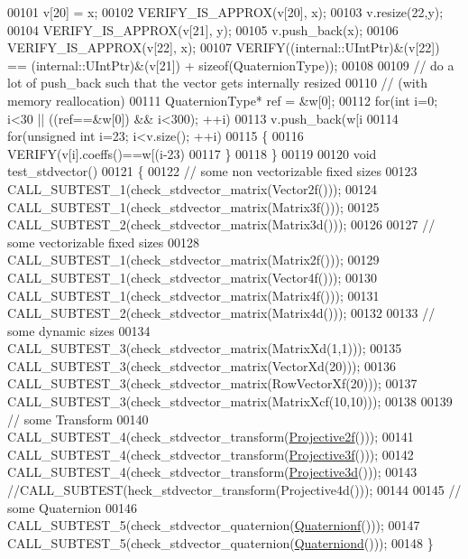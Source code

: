 \begin{DoxyCode}
00101   v[20] = x;
00102   VERIFY\_IS\_APPROX(v[20], x);
00103   v.resize(22,y);
00104   VERIFY\_IS\_APPROX(v[21], y);
00105   v.push\_back(x);
00106   VERIFY\_IS\_APPROX(v[22], x);
00107   VERIFY((internal::UIntPtr)&(v[22]) == (internal::UIntPtr)&(v[21]) + \textcolor{keyword}{sizeof}(QuaternionType));
00108 
00109   \textcolor{comment}{// do a lot of push\_back such that the vector gets internally resized}
00110   \textcolor{comment}{// (with memory reallocation)}
00111   QuaternionType* ref = &w[0];
00112   \textcolor{keywordflow}{for}(\textcolor{keywordtype}{int} i=0; i<30 || ((ref==&w[0]) && i<300); ++i)
00113     v.push\_back(w[i%
00114   \textcolor{keywordflow}{for}(\textcolor{keywordtype}{unsigned} \textcolor{keywordtype}{int} i=23; i<v.size(); ++i)
00115   \{
00116     VERIFY(v[i].coeffs()==w[(i-23)%
00117   \}
00118 \}
00119 
00120 \textcolor{keywordtype}{void} test\_stdvector()
00121 \{
00122   \textcolor{comment}{// some non vectorizable fixed sizes}
00123   CALL\_SUBTEST\_1(check\_stdvector\_matrix(Vector2f()));
00124   CALL\_SUBTEST\_1(check\_stdvector\_matrix(Matrix3f()));
00125   CALL\_SUBTEST\_2(check\_stdvector\_matrix(Matrix3d()));
00126 
00127   \textcolor{comment}{// some vectorizable fixed sizes}
00128   CALL\_SUBTEST\_1(check\_stdvector\_matrix(Matrix2f()));
00129   CALL\_SUBTEST\_1(check\_stdvector\_matrix(Vector4f()));
00130   CALL\_SUBTEST\_1(check\_stdvector\_matrix(Matrix4f()));
00131   CALL\_SUBTEST\_2(check\_stdvector\_matrix(Matrix4d()));
00132 
00133   \textcolor{comment}{// some dynamic sizes}
00134   CALL\_SUBTEST\_3(check\_stdvector\_matrix(MatrixXd(1,1)));
00135   CALL\_SUBTEST\_3(check\_stdvector\_matrix(VectorXd(20)));
00136   CALL\_SUBTEST\_3(check\_stdvector\_matrix(RowVectorXf(20)));
00137   CALL\_SUBTEST\_3(check\_stdvector\_matrix(MatrixXcf(10,10)));
00138 
00139   \textcolor{comment}{// some Transform}
00140   CALL\_SUBTEST\_4(check\_stdvector\_transform(\hyperlink{group___geometry___module_ga8c0a922ca75a04ef2f6c310dad0a4ab8}{Projective2f}()));
00141   CALL\_SUBTEST\_4(check\_stdvector\_transform(\hyperlink{group___geometry___module_gab14804071b7486b6666f3d324475a478}{Projective3f}()));
00142   CALL\_SUBTEST\_4(check\_stdvector\_transform(\hyperlink{group___geometry___module_gab9cec8c457da930391eb73370e07aaae}{Projective3d}()));
00143   \textcolor{comment}{//CALL\_SUBTEST(heck\_stdvector\_transform(Projective4d()));}
00144 
00145   \textcolor{comment}{// some Quaternion}
00146   CALL\_SUBTEST\_5(check\_stdvector\_quaternion(\hyperlink{group___geometry___module_ga785b13a5a87f9bf55d4eba51ead2dcf0}{Quaternionf}()));
00147   CALL\_SUBTEST\_5(check\_stdvector\_quaternion(\hyperlink{group___geometry___module_ga6e77eb8b6aae0e04be2db88107dbc642}{Quaterniond}()));
00148 \}
\end{DoxyCode}
